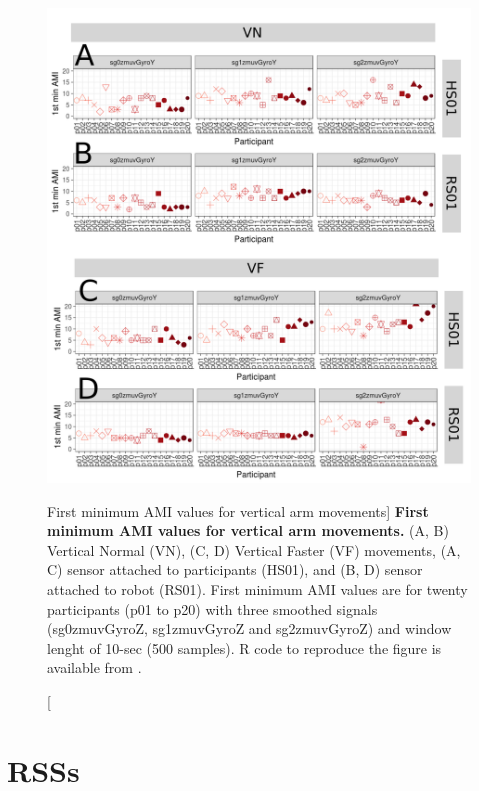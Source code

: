 \begin{figure}
\centering
\includegraphics[width=1.0\textwidth]{ami_aVw10}
	\caption
	[First minimum AMI values for vertical arm movements]{
	{\bf First minimum AMI values for vertical arm movements.}
		(A, B) Vertical Normal (VN), (C, D) Vertical Faster (VF) 
		movements,
		(A, C) sensor attached to participants (HS01), and
		(B, D) sensor attached to robot (RS01).
		First minimum AMI values are for twenty participants 
		(p01 to p20) with three smoothed signals (sg0zmuvGyroZ, 
		sg1zmuvGyroZ and sg2zmuvGyroZ) and  window lenght of 
		10-sec (500 samples).
		R code to reproduce the figure is available 
		from \cite{hwum2018}.
        }
    \label{fig:amiV}
\end{figure}




\newpage
\section{RSSs} \label{appendix:e:rsss}

